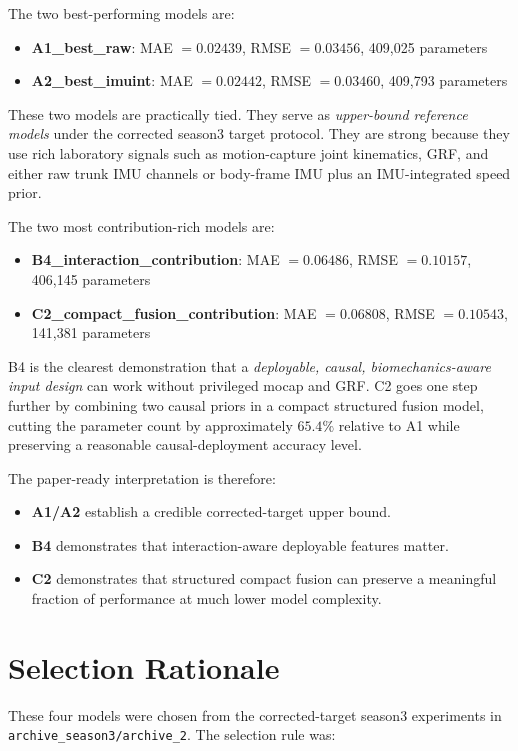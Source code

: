 \documentclass[11pt,a4paper]{article}
\begin{document}
The two best-performing models are:
\begin{itemize}
\item \textbf{A1\_best\_raw}: MAE \(= 0.02439\), RMSE \(= 0.03456\), 409,025 parameters
\item \textbf{A2\_best\_imuint}: MAE \(= 0.02442\), RMSE \(= 0.03460\), 409,793 parameters
\end{itemize}

These two models are practically tied. They serve as \emph{upper-bound reference models} under the corrected season3 target protocol. They are strong because they use rich laboratory signals such as motion-capture joint kinematics, GRF, and either raw trunk IMU channels or body-frame IMU plus an IMU-integrated speed prior.

The two most contribution-rich models are:
\begin{itemize}
\item \textbf{B4\_interaction\_contribution}: MAE \(= 0.06486\), RMSE \(= 0.10157\), 406,145 parameters
\item \textbf{C2\_compact\_fusion\_contribution}: MAE \(= 0.06808\), RMSE \(= 0.10543\), 141,381 parameters
\end{itemize}

B4 is the clearest demonstration that a \emph{deployable, causal, biomechanics-aware input design} can work without privileged mocap and GRF. C2 goes one step further by combining two causal priors in a compact structured fusion model, cutting the parameter count by approximately \(65.4\%\) relative to A1 while preserving a reasonable causal-deployment accuracy level.

The paper-ready interpretation is therefore:
\begin{itemize}
\item \textbf{A1/A2} establish a credible corrected-target upper bound.
\item \textbf{B4} demonstrates that interaction-aware deployable features matter.
\item \textbf{C2} demonstrates that structured compact fusion can preserve a meaningful fraction of performance at much lower model complexity.
\end{itemize}

\section{Selection Rationale}

These four models were chosen from the corrected-target season3 experiments in \texttt{archive\_season3/archive\_2}.
The selection rule was:
\end{document}

